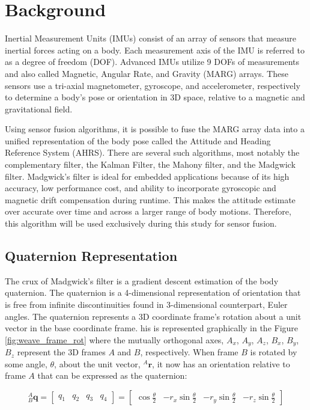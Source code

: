 \section{Background}
Inertial Measurement Units (IMUs) consist of an array of sensors that measure inertial forces acting on a body. 
Each measurement axis of the IMU is referred to as a degree of freedom (DOF). 
Advanced IMUs utilize 9 DOFs of measurements and also called Magnetic, Angular Rate, and Gravity (MARG) arrays. 
These sensors use a tri-axial magnetometer, gyroscope, and accelerometer, respectively to determine a body’s pose or orientation in 3D space, relative to a magnetic and gravitational field.

Using sensor fusion algorithms, it is possible to fuse the MARG array data into a unified representation of the body pose called the Attitude and Heading Reference System (AHRS). 
There are several such algorithms, most notably the complementary filter, the Kalman Filter, the Mahony filter, and the Madgwick filter. 
Madgwick’s filter is ideal for embedded applications because of its high accuracy, low performance cost, and ability to incorporate gyroscopic and magnetic drift compensation during runtime. 
This makes the attitude estimate over accurate over time and across a larger range of body motions. 
Therefore, this algorithm will be used exclusively during this study for sensor fusion.

\subsection{Quaternion Representation}

The crux of Madgwick’s filter is a gradient descent estimation of the body quaternion. 
The quaternion is a 4-dimensional representation of orientation that is free from infinite discontinuities found in 3-dimensional counterpart, Euler angles. 
The quaternion represents a 3D coordinate frame’s rotation about a unit vector in the base coordinate frame. 
his is represented graphically in the Figure \ref{fig:weave_frame_rot} where the mutually orthogonal axes, $A_x$, $A_y$, $A_z$, $B_x$, $B_y$, $B_z$ represent the 3D frames $A$ and $B$, respectively.
When frame $B$ is rotated by some angle, $\theta$, about the unit vector, ${}^A \pmb{r}$, it now has an orientation relative to frame $A$ that can be expressed as the quaternion:

\begin{equation}
    {}^A_B\textbf{q} = \begin{bmatrix} q_1 & q_2 & q_3 & q_4 \end{bmatrix} = \begin{bmatrix} \cos\frac{\theta}{2} & -r_x\sin\frac{\theta}{2} & -r_y\sin\frac{\theta}{2} & -r_z\sin\frac{\theta}{2} \end{bmatrix}
\end{equation}

